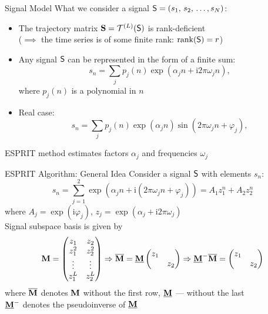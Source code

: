 \documentclass[pdf, unicode, ucs, notheorems]{beamer}
\theoremstyle{definition}
\begin{document}
\begin{frame}{Signal Model}
  What we consider a signal $\mathsf{S} = (s_1,\, s_2,\, \ldots, s_N)$:\smallskip
  \begin{itemize}
    \item The trajectory matrix $\mathbf{S} = \mathcal{T}^{(L)}(\mathsf{S})$ is rank-deficient \\
      ($\implies$ the time series is of some finite rank:
      $\operatorname{rank}(\mathsf{S})=r$)
      \medskip
    \item Any signal $\mathsf{S}$ can be represented in the form of a finite sum:
      \[
        s_n = \sum_{j} p_j(n) \exp(\alpha_j n + \mathrm{i}2\pi
        \omega_j n),
      \]
      where $p_j(n)$ is a polynomial in $n$
      \medskip
    \item Real case:
      \[
        s_n = \sum_{j} p_j(n) \exp(\alpha_j n)\sin(2\pi
        \omega_j n + \varphi_j),
      \]
  \end{itemize}
  \bigskip
  ESPRIT method estimates factors $\alpha_j$ and
  frequencies $\omega_j$
\end{frame}

\begin{frame}{ESPRIT Algorithm: General Idea}
  Consider a signal $\mathsf{S}$ with elements $s_n$:
  \[
    s_n = \sum_{j=1}^{2} \exp(\alpha_j n + \mathrm{i}(2\pi
    \omega_j n + \varphi_j)) = A_1 z_1^n + A_2 z_2^n
  \]
  where $A_j = \exp(\mathrm{i} \varphi_j)$, $z_j = \exp(\alpha_j +
  \mathrm{i}2\pi\omega_j)$ \vspace{0.4cm}\\
  Signal subspace basis is given by
  \[
    \mathbf{M} =
    \begin{pmatrix}
      z_1 & z_2 \\
      z_1^2 & z_2^2\\
      \vdots & \vdots \\
      z_1^L & z_2^L
    \end{pmatrix} \Rightarrow \overline{\mathbf{M}} = \underline{\mathbf{M}}
    \begin{pmatrix}
      z_1 & \\ & z_2
    \end{pmatrix}\Rightarrow  \underline{\mathbf{M}}^{-}\overline{\mathbf{M}} =
    \begin{pmatrix}
      z_1 & \\ & z_2
    \end{pmatrix}
  \]
  where $\overline{\mathbf{M}}$ denotes $\mathbf{M}$ without the first row,
  $\underline{\mathbf{M}}$ --- without the last\\
  $\underline{\mathbf{M}}^{-}$ denotes the pseudoinverse of $\underline{\mathbf{M}}$
\end{frame}
\end{document}
